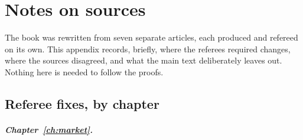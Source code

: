 \chapter{Notes on sources}\label{app:sources}
\small

The book was rewritten from seven separate articles, each produced and refereed on its own. This appendix
records, briefly, where the referees required changes, where the sources disagreed, and what the main
text deliberately leaves out. Nothing here is needed to follow the proofs.

\section{Referee fixes, by chapter}

\paragraph{Chapter~\ref{ch:market}.}
